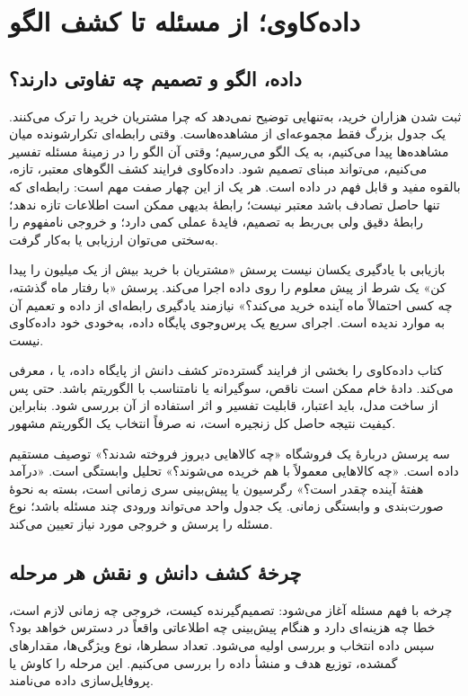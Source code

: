 \chapter{داده‌کاوی؛ از مسئله تا کشف الگو}

\section{داده، الگو و تصمیم چه تفاوتی دارند؟}
ثبت شدن هزاران خرید، به‌تنهایی توضیح نمی‌دهد که چرا مشتریان خرید را ترک می‌کنند. یک جدول بزرگ فقط مجموعه‌ای از مشاهده‌هاست. وقتی رابطه‌ای تکرارشونده میان مشاهده‌ها پیدا می‌کنیم، به یک الگو می‌رسیم؛ وقتی آن الگو را در زمینهٔ مسئله تفسیر می‌کنیم، می‌تواند مبنای تصمیم شود. داده‌کاوی  فرایند کشف الگوهای معتبر، تازه، بالقوه مفید و قابل فهم در داده است. هر یک از این چهار صفت مهم است: رابطه‌ای که تنها حاصل تصادف باشد معتبر نیست؛ رابطهٔ بدیهی ممکن است اطلاعات تازه ندهد؛ رابطهٔ دقیق ولی بی‌ربط به تصمیم، فایدهٔ عملی کمی دارد؛ و خروجی نامفهوم را به‌سختی می‌توان ارزیابی یا به‌کار گرفت.

\begin{definition}{بازیابی با یادگیری یکسان نیست}
پرسش «مشتریان با خرید بیش از یک میلیون را پیدا کن» یک شرط از پیش معلوم را روی داده اجرا می‌کند. پرسش «با رفتار ماه گذشته، چه کسی احتمالاً ماه آینده خرید می‌کند؟» نیازمند یادگیری رابطه‌ای از داده و تعمیم آن به موارد ندیده است. اجرای سریع یک پرس‌وجوی پایگاه داده، به‌خودی خود داده‌کاوی نیست.
\end{definition}

کتاب داده‌کاوی را بخشی از فرایند گسترده‌تر کشف دانش از پایگاه داده، یا ، معرفی می‌کند. دادهٔ خام ممکن است ناقص، سوگیرانه یا نامتناسب با الگوریتم باشد. حتی پس از ساخت مدل، باید اعتبار، قابلیت تفسیر و اثر استفاده از آن بررسی شود. بنابراین کیفیت نتیجه حاصل کل زنجیره است، نه صرفاً انتخاب یک الگوریتم مشهور.

\begin{example}{سه پرسش دربارهٔ یک فروشگاه}
«چه کالاهایی دیروز فروخته شدند؟» توصیف مستقیم داده است. «چه کالاهایی معمولاً با هم خریده می‌شوند؟» تحلیل وابستگی است. «درآمد هفتهٔ آینده چقدر است؟» رگرسیون یا پیش‌بینی سری زمانی است، بسته به نحوهٔ صورت‌بندی و وابستگی زمانی. یک جدول واحد می‌تواند ورودی چند مسئله باشد؛ نوع مسئله را پرسش و خروجی مورد نیاز تعیین می‌کند.
\end{example}

\section{چرخهٔ کشف دانش و نقش هر مرحله}
چرخه با فهم مسئله آغاز می‌شود: تصمیم‌گیرنده کیست، خروجی چه زمانی لازم است، خطا چه هزینه‌ای دارد و هنگام پیش‌بینی چه اطلاعاتی واقعاً در دسترس خواهد بود؟ سپس داده انتخاب و بررسی اولیه می‌شود. تعداد سطرها، نوع ویژگی‌ها، مقدارهای گمشده، توزیع هدف و منشأ داده را بررسی می‌کنیم. این مرحله را کاوش یا پروفایل‌سازی داده می‌نامند.

